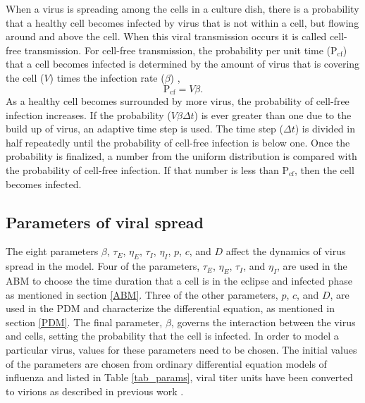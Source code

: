 When a virus is spreading among the cells in a culture dish, there is a probability that a healthy cell becomes infected by virus that is not within a cell, but flowing around and above the cell. When this viral transmission occurs it is called cell-free transmission. For cell-free transmission, the probability per unit time ($\mathrm{P_{cf}}$) that a cell becomes infected is determined by the amount of virus that is covering the cell ($V$) times the infection rate ($\beta$) \citep{holder11autoimm}, 
$$\mathrm{P_{cf}} = V \beta.$$ 
As a healthy cell becomes surrounded by more virus, the probability of cell-free infection increases. If the probability ($V \beta \Delta t$) is ever greater than one due to the build up of virus, an adaptive time step is used. The time step ($\Delta t$) is divided in half repeatedly until the probability of cell-free infection is below one. Once the probability is finalized, a number from the uniform distribution is compared with the probability of cell-free infection. If that number is less than $\mathrm{P_{cf}}$, then the cell becomes infected.


\subsection{Parameters of viral spread}

The eight parameters $\beta$, $\tau_E$, $\eta_E$, $\tau_I$, $\eta_I$, $p$, $c$, and $D$ affect the dynamics of virus spread in the model. Four of the parameters, $\tau_E$, $\eta_E$, $\tau_I$, and $\eta_I$, are used in the ABM to choose the time duration that a cell is in the eclipse and infected phase as mentioned in section \ref{ABM}. Three of the other parameters, $p$, $c$, and $D$, are used in the PDM and characterize the differential equation, as mentioned in section \ref{PDM}. The final parameter, $\beta$, governs the interaction between the virus and cells, setting the probability that the cell is infected. In order to model a particular virus, values for these parameters need to be chosen. The initial values of the parameters are chosen from ordinary differential equation models of influenza and listed in Table \ref{tab_params}, viral titer units have been converted to virions as described in previous work \citep{dobrovolny17}. %


